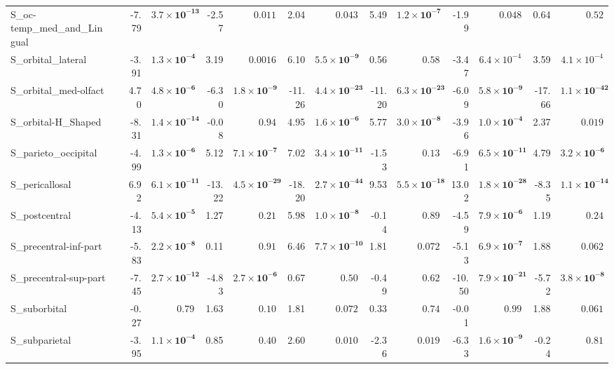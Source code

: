 {\begin{longtable}{llrrrrrrrrrrrr}
S\_oc-temp\_med\_and\_Lingual &  & -7.79 & $\mathbf{3.7{\times}10^{-13}}$ & -2.57 & $0.011$ & 2.04 & $0.043$ & 5.49 & $\mathbf{1.2{\times}10^{-7}}$ & -1.99 & $0.048$ & 0.64 & $0.52$ \\
S\_orbital\_lateral &  & -3.91 & $\mathbf{1.3{\times}10^{-4}}$ & 3.19 & $0.0016$ & 6.10 & $\mathbf{5.5{\times}10^{-9}}$ & 0.56 & $0.58$ & -3.47 & $6.4{\times}10^{-4}$ & 3.59 & $4.1{\times}10^{-4}$ \\
S\_orbital\_med-olfact &  & 4.70 & $\mathbf{4.8{\times}10^{-6}}$ & -6.30 & $\mathbf{1.8{\times}10^{-9}}$ & -11.26 & $\mathbf{4.4{\times}10^{-23}}$ & -11.20 & $\mathbf{6.3{\times}10^{-23}}$ & -6.09 & $\mathbf{5.8{\times}10^{-9}}$ & -17.66 & $\mathbf{1.1{\times}10^{-42}}$ \\
S\_orbital-H\_Shaped &  & -8.31 & $\mathbf{1.4{\times}10^{-14}}$ & -0.08 & $0.94$ & 4.95 & $\mathbf{1.6{\times}10^{-6}}$ & 5.77 & $\mathbf{3.0{\times}10^{-8}}$ & -3.96 & $\mathbf{1.0{\times}10^{-4}}$ & 2.37 & $0.019$ \\
S\_parieto\_occipital &  & -4.99 & $\mathbf{1.3{\times}10^{-6}}$ & 5.12 & $\mathbf{7.1{\times}10^{-7}}$ & 7.02 & $\mathbf{3.4{\times}10^{-11}}$ & -1.53 & $0.13$ & -6.91 & $\mathbf{6.5{\times}10^{-11}}$ & 4.79 & $\mathbf{3.2{\times}10^{-6}}$ \\
S\_pericallosal &  & 6.92 & $\mathbf{6.1{\times}10^{-11}}$ & -13.22 & $\mathbf{4.5{\times}10^{-29}}$ & -18.20 & $\mathbf{2.7{\times}10^{-44}}$ & 9.53 & $\mathbf{5.5{\times}10^{-18}}$ & 13.02 & $\mathbf{1.8{\times}10^{-28}}$ & -8.35 & $\mathbf{1.1{\times}10^{-14}}$ \\
S\_postcentral &  & -4.13 & $\mathbf{5.4{\times}10^{-5}}$ & 1.27 & $0.21$ & 5.98 & $\mathbf{1.0{\times}10^{-8}}$ & -0.14 & $0.89$ & -4.59 & $\mathbf{7.9{\times}10^{-6}}$ & 1.19 & $0.24$ \\
S\_precentral-inf-part &  & -5.83 & $\mathbf{2.2{\times}10^{-8}}$ & 0.11 & $0.91$ & 6.46 & $\mathbf{7.7{\times}10^{-10}}$ & 1.81 & $0.072$ & -5.13 & $\mathbf{6.9{\times}10^{-7}}$ & 1.88 & $0.062$ \\
S\_precentral-sup-part &  & -7.45 & $\mathbf{2.7{\times}10^{-12}}$ & -4.83 & $\mathbf{2.7{\times}10^{-6}}$ & 0.67 & $0.50$ & -0.49 & $0.62$ & -10.50 & $\mathbf{7.9{\times}10^{-21}}$ & -5.72 & $\mathbf{3.8{\times}10^{-8}}$ \\
S\_suborbital &  & -0.27 & $0.79$ & 1.63 & $0.10$ & 1.81 & $0.072$ & 0.33 & $0.74$ & -0.01 & $0.99$ & 1.88 & $0.061$ \\
S\_subparietal &  & -3.95 & $\mathbf{1.1{\times}10^{-4}}$ & 0.85 & $0.40$ & 2.60 & $0.010$ & -2.36 & $0.019$ & -6.33 & $\mathbf{1.6{\times}10^{-9}}$ & -0.24 & $0.81$ \\

\end{longtable}}
